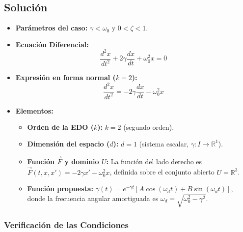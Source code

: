 \begin{enumerate}[label=\arabic*., leftmargin=*]
\begin{enumerate}[label=(\alph*), leftmargin=*]
        \subsection{Solución}
        \begin{itemize}[leftmargin=*]
            \item \textbf{Parámetros del caso:} $\gamma < \omega_0$ y $0 < \zeta < 1$.
            
            \item \textbf{Ecuación Diferencial:}
            \[ \frac{d^2x}{dt^2} + 2\gamma\frac{dx}{dt} + \omega_0^2 x = 0 \]
            
            \item \textbf{Expresión en forma normal ($k = 2$):}
            \[ \frac{d^2x}{dt^2} = -2\gamma\frac{dx}{dt} - \omega_0^2 x \]
            
            \item \textbf{Elementos:}
            \begin{itemize}[leftmargin=*]
                \item \textbf{Orden de la EDO ($k$):} $k = 2$ (segundo orden).
                \item \textbf{Dimensión del espacio ($d$):} $d = 1$ (sistema escalar, $\gamma: I \to \mathbb{R}^1$).
                \item \textbf{Función $\vec{F}$ y dominio $U$:} La función del lado derecho es $\vec{F}(t, x, x') = -2\gamma x' - \omega_0^2 x$, definida sobre el conjunto abierto $U = \mathbb{R}^3$.
                \item \textbf{Función propuesta:} $\gamma(t) = e^{-\gamma t}[A \cos(\omega_d t) + B \sin(\omega_d t)]$, donde la frecuencia angular amortiguada es $\omega_d = \sqrt{\omega_0^2 - \gamma^2}$.
            \end{itemize}
        \end{itemize}

        \subsubsection*{Verificación de las Condiciones}


\end{enumerate}
\end{enumerate}
